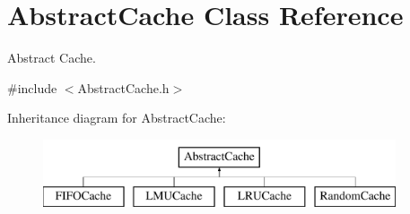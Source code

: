 \hypertarget{classAbstractCache}{\section{\-Abstract\-Cache \-Class \-Reference}
\label{classAbstractCache}
}


\-Abstract \-Cache.  




{\ttfamily \#include $<$\-Abstract\-Cache.\-h$>$}

\-Inheritance diagram for \-Abstract\-Cache\-:\begin{figure}[H]
\begin{center}
\leavevmode
\includegraphics[height=2.000000cm]{classAbstractCache}
\end{center}
\end{figure}
